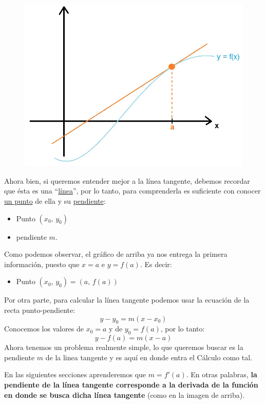\documentclass[12pt]{article}
\begin{document}
\begin{figure}[hbt!]
\centering
\includegraphics[scale=0.5]{img/tangent_line_intro.jpg}
\end{figure}

\newpage

Ahora bien, si queremos entender mejor a la línea tangente, debemos recordar que ésta es una ``\underline{línea}'', por lo tanto, para comprenderla es suficiente con conocer \underline{un punto} de ella y su \underline{pendiente}:

\begin{itemize}
\item Punto $(x_{0}, \, y_{0})$
\item pendiente $m$.
\end{itemize}

Como podemos observar, el gráfico de arriba ya nos entrega la primera información, puesto que $x = a$ e $y = f(a)$. Es decir:

\begin{itemize}
\item Punto $(x_{0}, \, y_{0}) = (a, \, f(a))$
\end{itemize}

Por otra parte, para calcular la línea tangente podemos usar la ecuación de la recta punto-pendiente:
\[y - y_{0} = m(x - x_{0})\]
Conocemos los valores de $x_{0} = a$ y de $y_{0} = f(a)$, por lo tanto:
\[y - f(a) = m(x - a)\]
Ahora tenemos un problema realmente simple, lo que queremos buscar es la pendiente $m$ de la linea tangente y es aquí en donde entra el Cálculo como tal.

En las siguientes secciones aprenderemos que \underline{$m = f'(a)$}. En otras palabras, \textbf{la pendiente de la línea tangente corresponde a la derivada de la función en donde se busca dicha línea tangente} (como en la imagen de arriba).
\end{document}
